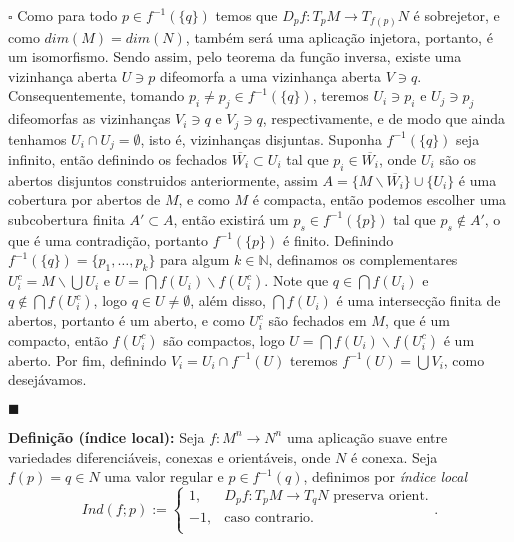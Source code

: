 \documentclass{article}
\begin{document}
	$\square$ Como para todo $p \in f^{-1}(\{q\})$ temos que $D_{p}f : T_{p}M \to T_{f(p)}N$ é sobrejetor, e como $dim(M) = dim(N)$, também será uma aplicação injetora, portanto, é um isomorfismo. Sendo assim, pelo teorema da função inversa, existe uma vizinhança aberta $U \ni p$ difeomorfa a uma vizinhança aberta $V \ni q$. Consequentemente, tomando $p_{i} \neq p_{j} \in f^{-1}(\{q\})$, teremos $U_{i} \ni p_{i}$ e $U_{j} \ni p_{j}$ difeomorfas as vizinhanças $V_{i} \ni q$ e $V_{j} \ni q$, respectivamente, e de modo que ainda tenhamos $U_{i} \cap U_{j} = \emptyset$, isto é, vizinhanças disjuntas. Suponha $f^{-1}(\{q\})$ seja infinito, então definindo os fechados $\overline{W_{i}} \subset U_{i}$ tal que $p_{i} \in \overline{W_{i}}$, onde $U_{i}$ são os abertos disjuntos construidos anteriormente, assim $A = \{M \backslash \overline{W_{i}} \} \cup \{U_{i}\}$ é uma cobertura por abertos de $M$, e como $M$ é compacta, então podemos escolher uma subcobertura finita $A' \subset A$, então existirá um $p_{s} \in f^{-1}(\{p\})$ tal que $p_{s} \notin A'$, o que é uma contradição, portanto $f^{-1}(\{p\})$ é finito. Definindo $f^{-1}(\{q\}) = \{p_{1}, \dots, p_{k}\}$ para algum $k \in \mathbb{N}$, definamos os complementares $U_{i}^{c} = M \backslash \bigcup U_{i}$ e $U = \bigcap f(U_{i}) \backslash f(U_{i}^{c})$. Note que $q \in \bigcap f(U_{i})$ e $q \notin \bigcap f(U_{i}^{c})$, logo  $q \in U \neq \emptyset$, além disso, $\bigcap f(U_{i})$ é uma intersecção finita de abertos, portanto é um aberto, e como $U_{i}^{c}$ são fechados em $M$, que é um compacto, então $f(U_{i}^{c})$ são compactos, logo $U = \bigcap f(U_{i}) \backslash f(U_{i}^{c})$ é um aberto. Por fim, definindo $V_{i} = U_{i} \cap f^{-1}(U)$ teremos $f^{-1}(U) = \bigcup V_{i}$, como desejávamos. 
	
	$\blacksquare$
	
	\vspace{2mm}
	\textbf{Definição (índice local):} Seja $f : M^{n} \to N^{n}$ uma aplicação suave entre variedades diferenciáveis, conexas e orientáveis, onde $N$ é conexa. Seja $f(p) = q \in N$ uma valor regular e $p \in f^{-1}(q)$, definimos por \textit{índice local}
	$$
	Ind(f; p) := \left\{
	\begin{array}{cc}
	1, & D_{p}f : T_{p}M \to T_{q}N \text{ preserva orient.} \\
	-1, & \text{caso contrario}.\\
	\end{array}.
	\right.
	$$
	
\end{document}
